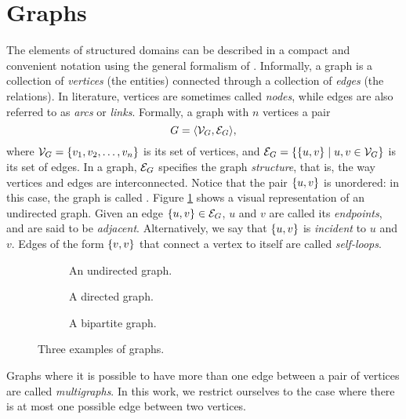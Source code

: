 \section{Graphs}\label{sec:graphs}
The elements of structured domains can be described in a compact and convenient notation using the general formalism of  \citep{bondy1976graph}. Informally, a graph is a collection of \emph{vertices} (the entities) connected through a collection of \emph{edges} (the relations). In literature, vertices are sometimes called \emph{nodes}, while edges are also referred to as \emph{arcs} or \emph{links}. Formally, a graph with $n$ vertices a pair
$$G =\langle \Cal{V}_G, \Cal{E}_G \rangle,$$
where $\Cal{V}_G = \Set{v_1, v_2, \ldots, v_n}$ is its set of vertices, and $\Cal{E}_G = \{\{u, v\} \mid u, v \in \Cal{V}_G\}$ is its set of edges. In a graph, $\Cal{E}_G$  specifies the graph \emph{structure}, that is, the way vertices and edges are interconnected. Notice that the pair $\{ u,v \}$ is unordered: in this case, the graph is called . Figure \ref{fig:undirected-graph} shows a visual representation of an undirected graph.
Given an edge $\Set{u, v} \in \Cal{E}_G$, $u$ and $v$ are called its \emph{endpoints}, and are said to be \emph{adjacent}. Alternatively, we say that $\{ u, v \}$ is \emph{incident} to $u$ and $v$. Edges of the form $\{ v,v \}$ that connect a vertex to itself are called \emph{self-loops}.
\begin{figure*}
    \begin{subfigure}[b]{0.38\linewidth}
        \centering
        \resizebox{.8\textwidth}{!}{}
        \caption{An undirected graph.}
        \label{fig:undirected-graph}
    \end{subfigure}
    \begin{subfigure}[b]{0.32\linewidth}
        \centering
        \resizebox{.8\textwidth}{!}{}
        \caption{A directed graph.}
        \label{fig:directed-graph}
    \end{subfigure}
    \begin{subfigure}[b]{0.25\linewidth}
        \centering
        \resizebox{.9\textwidth}{!}{}
        \caption{A bipartite graph.}
        \label{fig:bipartite-graph}
    \end{subfigure}
    \caption{Three examples of graphs.}
\end{figure*}
Graphs where it is possible to have more than one edge between a pair of vertices are called \emph{multigraphs}. In this work, we restrict ourselves to the case where there is at most one possible edge between two vertices.

